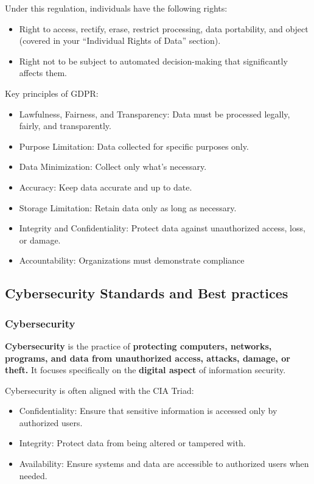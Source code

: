 Under this regulation, individuals have the following rights:

\begin{itemize}
    \item Right to access, rectify, erase, restrict processing, data portability, and object (covered in your “Individual Rights of Data” section).
    \item Right not to be subject to automated decision-making that significantly affects them.
\end{itemize}

Key principles of GDPR:

\begin{itemize}
    \item Lawfulness, Fairness, and Transparency: Data must be processed legally, fairly, and transparently.
    \item Purpose Limitation: Data collected for specific purposes only.
    \item Data Minimization: Collect only what’s necessary.
    \item Accuracy: Keep data accurate and up to date.
    \item Storage Limitation: Retain data only as long as necessary.
    \item Integrity and Confidentiality: Protect data against unauthorized access, loss, or damage.
    \item Accountability: Organizations must demonstrate compliance
\end{itemize}

\subsection{Cybersecurity Standards and Best practices}

\subsubsection{Cybersecurity}

\indent 

\textbf{Cybersecurity} is the practice of \textbf{protecting computers, networks, programs, and data from unauthorized access, attacks, damage, or theft.} It focuses specifically on the \textbf{digital aspect} of information security.

Cybersecurity is often aligned with the CIA Triad:

\begin{itemize}
    \item Confidentiality: Ensure that sensitive information is accessed only by authorized users.
    \item Integrity: Protect data from being altered or tampered with.
    \item Availability: Ensure systems and data are accessible to authorized users when needed.
\end{itemize}

